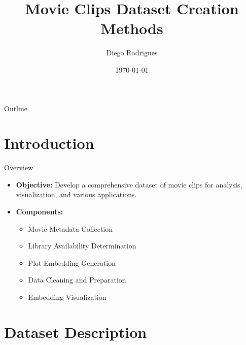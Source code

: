 \documentclass{beamer}
\title{Movie Clips Dataset Creation Methods}
\date{\today}
\author{Diego Rodrigues}
\begin{document}
\maketitle

\begin{frame}{Outline}
  \tableofcontents
\end{frame}

\section{Introduction}
\begin{frame}{Overview}
  \begin{itemize}
    \item \textbf{Objective:} Develop a comprehensive dataset of movie clips for analysis, visualization, and various applications.
    \item \textbf{Components:}
      \begin{itemize}
        \item Movie Metadata Collection
        \item Library Availability Determination
        \item Plot Embedding Generation
        \item Data Cleaning and Preparation
        \item Embedding Visualization
      \end{itemize}
  \end{itemize}
\end{frame}

\section{Dataset Description}
\end{document}
